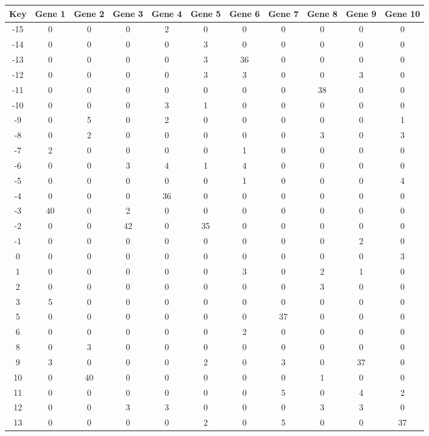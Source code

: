 \begin{tabular}{|c|c|c|c|c|c|c|c|c|c|c|}
\hline
Key & Gene 1 & Gene 2 & Gene 3 & Gene 4 & Gene 5 & Gene 6 & Gene 7 & Gene 8 & Gene 9 & Gene 10 \\
\hline
-15 & 0 & 0 & 0 & 2 & 0 & 0 & 0 & 0 & 0 & 0 \\
-14 & 0 & 0 & 0 & 0 & 3 & 0 & 0 & 0 & 0 & 0 \\
-13 & 0 & 0 & 0 & 0 & 3 & 36 & 0 & 0 & 0 & 0 \\
-12 & 0 & 0 & 0 & 0 & 3 & 3 & 0 & 0 & 3 & 0 \\
-11 & 0 & 0 & 0 & 0 & 0 & 0 & 0 & 38 & 0 & 0 \\
-10 & 0 & 0 & 0 & 3 & 1 & 0 & 0 & 0 & 0 & 0 \\
-9 & 0 & 5 & 0 & 2 & 0 & 0 & 0 & 0 & 0 & 1 \\
-8 & 0 & 2 & 0 & 0 & 0 & 0 & 0 & 3 & 0 & 3 \\
-7 & 2 & 0 & 0 & 0 & 0 & 1 & 0 & 0 & 0 & 0 \\
-6 & 0 & 0 & 3 & 4 & 1 & 4 & 0 & 0 & 0 & 0 \\
-5 & 0 & 0 & 0 & 0 & 0 & 1 & 0 & 0 & 0 & 4 \\
-4 & 0 & 0 & 0 & 36 & 0 & 0 & 0 & 0 & 0 & 0 \\
-3 & 40 & 0 & 2 & 0 & 0 & 0 & 0 & 0 & 0 & 0 \\
-2 & 0 & 0 & 42 & 0 & 35 & 0 & 0 & 0 & 0 & 0 \\
-1 & 0 & 0 & 0 & 0 & 0 & 0 & 0 & 0 & 2 & 0 \\
0 & 0 & 0 & 0 & 0 & 0 & 0 & 0 & 0 & 0 & 3 \\
1 & 0 & 0 & 0 & 0 & 0 & 3 & 0 & 2 & 1 & 0 \\
2 & 0 & 0 & 0 & 0 & 0 & 0 & 0 & 3 & 0 & 0 \\
3 & 5 & 0 & 0 & 0 & 0 & 0 & 0 & 0 & 0 & 0 \\
5 & 0 & 0 & 0 & 0 & 0 & 0 & 37 & 0 & 0 & 0 \\
6 & 0 & 0 & 0 & 0 & 0 & 2 & 0 & 0 & 0 & 0 \\
8 & 0 & 3 & 0 & 0 & 0 & 0 & 0 & 0 & 0 & 0 \\
9 & 3 & 0 & 0 & 0 & 2 & 0 & 3 & 0 & 37 & 0 \\
10 & 0 & 40 & 0 & 0 & 0 & 0 & 0 & 1 & 0 & 0 \\
11 & 0 & 0 & 0 & 0 & 0 & 0 & 5 & 0 & 4 & 2 \\
12 & 0 & 0 & 3 & 3 & 0 & 0 & 0 & 3 & 3 & 0 \\
13 & 0 & 0 & 0 & 0 & 2 & 0 & 5 & 0 & 0 & 37 \\
\hline
\end{tabular}